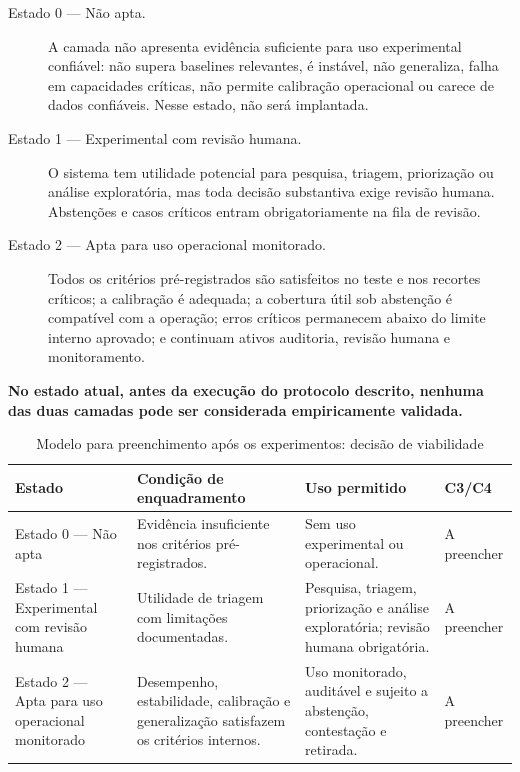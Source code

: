 \begin{description}
\item[Estado 0 --- Não apta.] A camada não apresenta evidência suficiente para uso experimental confiável: não supera baselines relevantes, é instável, não generaliza, falha em capacidades críticas, não permite calibração operacional ou carece de dados confiáveis. Nesse estado, não será implantada.
\item[Estado 1 --- Experimental com revisão humana.] O sistema tem utilidade potencial para pesquisa, triagem, priorização ou análise exploratória, mas toda decisão substantiva exige revisão humana. Abstenções e casos críticos entram obrigatoriamente na fila de revisão.
\item[Estado 2 --- Apta para uso operacional monitorado.] Todos os critérios pré-registrados são satisfeitos no teste e nos recortes críticos; a calibração é adequada; a cobertura útil sob abstenção é compatível com a operação; erros críticos permanecem abaixo do limite interno aprovado; e continuam ativos auditoria, revisão humana e monitoramento.
\end{description}

\textbf{No estado atual, antes da execução do protocolo descrito, nenhuma das duas camadas pode ser considerada empiricamente validada.}

\begin{table}[htbp]
\centering
\caption{Modelo para preenchimento após os experimentos: decisão de viabilidade}
\label{tab:resultados-viabilidade}
\begin{tabular}{|p{}|p{}|p{}|p{}|}
\hline
\textbf{Estado} & \textbf{Condição de enquadramento} & \textbf{Uso permitido} & \textbf{C3/C4} \\
\hline
Estado 0 --- Não apta & Evidência insuficiente nos critérios pré-registrados. & Sem uso experimental ou operacional. & A preencher \\
\hline
Estado 1 --- Experimental com revisão humana & Utilidade de triagem com limitações documentadas. & Pesquisa, triagem, priorização e análise exploratória; revisão humana obrigatória. & A preencher \\
\hline
Estado 2 --- Apta para uso operacional monitorado & Desempenho, estabilidade, calibração e generalização satisfazem os critérios internos. & Uso monitorado, auditável e sujeito a abstenção, contestação e retirada. & A preencher \\
\hline
\end{tabular}
\end{table}

